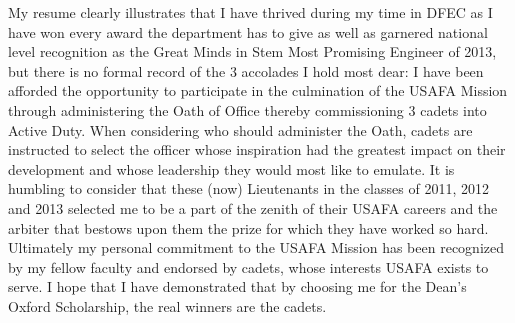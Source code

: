 \documentclass{article}
\begin{document}
My resume clearly illustrates that I have thrived during my time in DFEC as I
have won every award the department has to give as well as garnered national
level recognition as the Great Minds in Stem Most Promising Engineer of 2013,
but there is no formal record of the 3 accolades I hold most dear: I have been
afforded the opportunity to participate in the culmination of the USAFA Mission
through administering the Oath of Office thereby commissioning 3 cadets into
Active Duty. When considering who should administer the Oath, cadets are
instructed to select the officer whose inspiration had the greatest impact on
their development and whose leadership they would most like to emulate. It is
humbling to consider that these (now) Lieutenants in the classes of 2011, 2012
and 2013 selected me to be a part of the zenith of their USAFA careers and the
arbiter that bestows upon them the prize for which they have worked so hard.
Ultimately my personal commitment to the USAFA Mission has been recognized by
my fellow faculty and endorsed by cadets, whose interests USAFA exists to
serve. I hope that I have demonstrated that by choosing me for the Dean’s
Oxford Scholarship, the real winners are the cadets.
\end{document}
